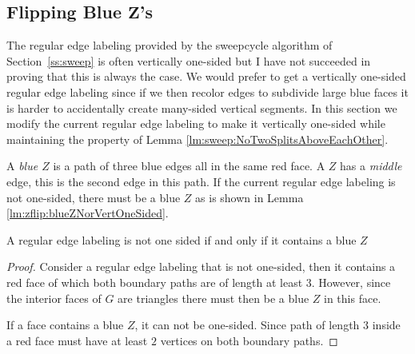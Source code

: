 
\subsection[Flipping Blue $\mathrm{Z}$'s]{Flipping Blue $\mathbf{Z}$'s}
\thispagestyle{plain}
\label{ss:flipBlueZ}

  The regular edge labeling provided by the sweepcycle algorithm of Section~\ref{ss:sweep} is often vertically one-sided but I have not succeeded in proving that this is always the case.
  We would prefer to get a vertically one-sided regular edge labeling since if we then recolor edges to subdivide large blue faces it is harder to accidentally create many-sided vertical segments.
  In this section we modify the current regular edge labeling to make it vertically one-sided while maintaining the property of Lemma \ref{lm:sweep:NoTwoSplitsAboveEachOther}.


  A \emph{blue $Z$} is a path of three blue edges all in the same red face. A $Z$ has a \emph{middle} edge, this is the second edge in this path.
  If the current regular edge labeling is not one-sided, there must be a blue $Z$ as is shown in Lemma \ref{lm:zflip:blueZNorVertOneSided}.
  \begin{lemma}
    \label{lm:zflip:blueZNorVertOneSided}
    A regular edge labeling is not one sided if and only if it contains a blue $Z$
  \end{lemma}
  \begin{proof}
    Consider a regular edge labeling that is not one-sided, then it contains a red face of which both boundary paths are of length at least $3$.
    However, since the interior faces of $G$ are triangles there must then be a blue $Z$ in this face.

    If a face contains a blue $Z$, it can not be one-sided. Since path of length $3$ inside a red face must have at least $2$ vertices on both boundary paths.
  \end{proof}

